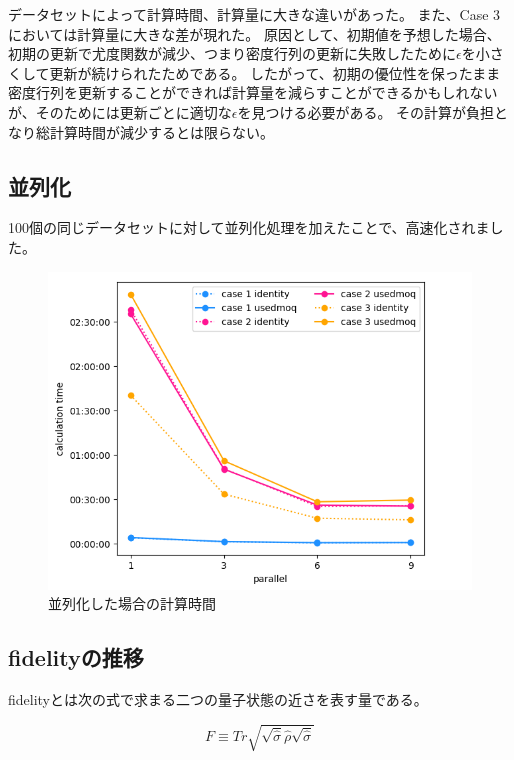 \documentclass[11pt,a4j,notitlepage]{jreport}
\begin{document}
	データセットによって計算時間、計算量に大きな違いがあった。
	また、Case 3においては計算量に大きな差が現れた。
	原因として、初期値を予想した場合、初期の更新で尤度関数が減少、つまり密度行列の更新に失敗したために$\epsilon$を小さくして更新が続けられたためである。
	したがって、初期の優位性を保ったまま密度行列を更新することができれば計算量を減らすことができるかもしれないが、そのためには更新ごとに適切な$\epsilon$を見つける必要がある。
	その計算が負担となり総計算時間が減少するとは限らない。

	\newpage

	\subsection*{並列化}

	100個の同じデータセットに対して並列化処理を加えたことで、高速化されました。

	\begin{figure}[htbp]
		\centering
			\includegraphics[clip,width=12.0cm]{./picture/parallel.png}
			\caption{並列化した場合の計算時間}
	\end{figure}

	\newpage

	\subsection*{fidelityの推移}

	fidelityとは次の式で求まる二つの量子状態の近さを表す量である。

	\begin{equation}
		F \equiv Tr \sqrt{\sqrt{\hat{\sigma}} \hat{\rho} \sqrt{\hat{\sigma}}}
	\end{equation}
\end{document}

